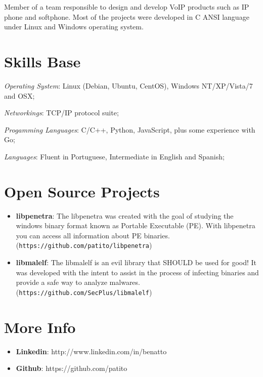\documentclass[margin]{res}
\begin{document}
\begin{resume}
    Member of a team responsible to design and develop VoIP products such as IP phone and 
    softphone. Most of the projects were developed in C ANSI language under Linux and Windows
    operating system.    

\section{Skills Base}

      \textit{Operating System}:  Linux (Debian, Ubuntu, CentOS), Windows NT/XP/Vista/7 and OSX;

			\textit{Networkings}: TCP/IP protocol suite;
  
			\textit{Progamming Languages}: C/C++, Python, JavaScript, plus some experience with Go;


			\textit{Languages}: Fluent in Portuguese, Intermediate in English and Spanish;
 
\section{Open Source Projects}
		\begin{itemize}
		    \vspace{2mm}
		    \item \textbf{libpenetra}: The libpenetra was created with the goal of studying the windows binary format known as Portable Executable (PE). With libpenetra you can access all information about PE binaries. (\texttt{https://github.com/patito/libpenetra}) \vspace{1mm}
		                               
		    \item \textbf{libmalelf}: The libmalelf is an evil library that SHOULD be used for good! It was developed with the intent to assist in the process of infecting binaries and provide a safe way to analyze malwares. (\texttt{https://github.com/SecPlus/libmalelf})\vspace{1mm}
		                              
		\end{itemize}
 
\section{More Info}
    \begin{itemize}
        \item \textbf{Linkedin}: http://www.linkedin.com/in/benatto
         \item \textbf{Github}: https://github.com/patito
    \end{itemize}


\end{resume} 
\end{document}
